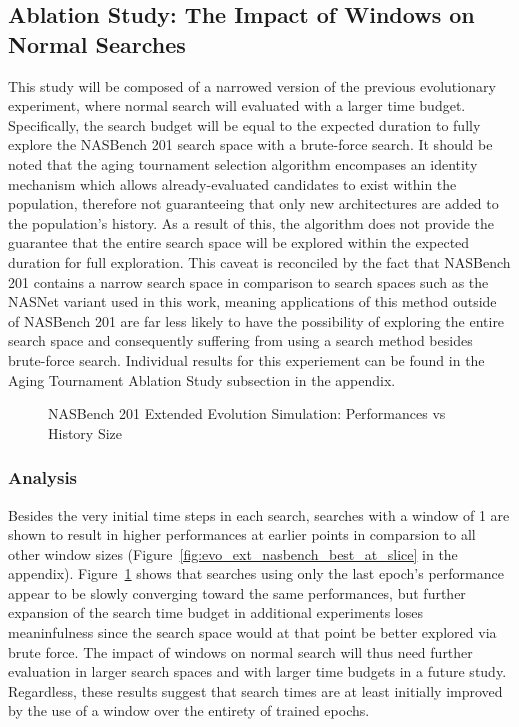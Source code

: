 \documentclass[twocolumn]{article}
\begin{document}
\subsection{Ablation Study: The Impact of Windows on Normal Searches}

This study will be composed of a narrowed version of the previous evolutionary experiment, where normal search will evaluated with a larger time budget.
Specifically, the search budget will be equal to the expected duration to fully explore the NASBench 201 search space with a brute-force search.
It should be noted that the aging tournament selection algorithm encompases an identity mechanism which allows already-evaluated candidates to exist within the population,
therefore not guaranteeing that only new architectures are added to the population's history.
As a result of this, the algorithm does not provide the guarantee that the entire search space will be explored within the expected duration for full exploration.
This caveat is reconciled by the fact that NASBench 201 contains a narrow search space in comparison to search spaces such as the NASNet variant used in this work,
meaning applications of this method outside of NASBench 201 are far less likely to have the possibility of exploring the entire search space and consequently suffering from using
a search method besides brute-force search.
Individual results for this experiement can be found in the Aging Tournament Ablation Study subsection in the appendix.

\begin{figure}[!h]
    \begin{center}
        \resizebox{\columnwidth}{!}{
            
        }
        \caption{NASBench 201 Extended Evolution Simulation: Performances vs History Size}
        \label{fig:evo_ext_nasbench_all_perfs}
    \end{center}
\end{figure}

\subsubsection{Analysis}

Besides the very initial time steps in each search, searches with a window of 1 are shown to result in higher performances at earlier points in comparsion to all other
window sizes (Figure~\ref{fig:evo_ext_nasbench_best_at_slice} in the appendix).
Figure~\ref{fig:evo_ext_nasbench_all_perfs} shows that searches using only the last epoch's performance appear to be slowly converging toward the same performances, 
but further expansion of the search time budget in additional experiments loses meaninfulness since the search space would at that point be better explored via brute force.
The impact of windows on normal search will thus need further evaluation in larger search spaces and with larger time budgets in a future study.
Regardless, these results suggest that search times are at least initially improved by the use of a window over the entirety of trained epochs.
\end{document}
